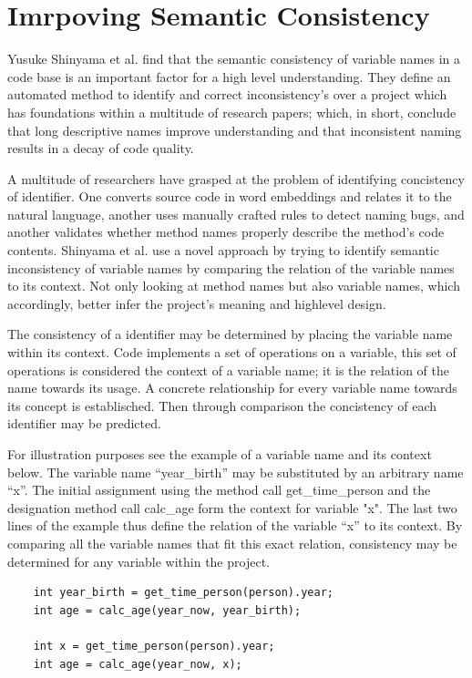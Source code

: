 \documentclass[a4paper,12pt]{article}
\begin{document}
\newpage

\section{Imrpoving Semantic Consistency}
Yusuke Shinyama et al. find that the semantic consistency of variable names in a code base is an important factor for a high level understanding. They define an automated method to identify and correct inconsistency’s over a project which has foundations within a multitude of research papers; which, in short, conclude that long descriptive names improve understanding and that inconsistent naming results in a decay of code quality.

A multitude of researchers have grasped at the problem of identifying concistency of identifier. One converts source code in word embeddings and relates it to the natural language, another uses manually crafted rules to detect naming bugs, and another validates whether method names properly describe the method’s code contents. Shinyama et al. use a novel approach by trying to identify semantic inconsistency of variable names by comparing the relation of the variable names to its context. Not only looking at method names but also variable names, which accordingly, better infer the project’s meaning and highlevel design.

The consistency of a identifier may be determined by placing the variable name within its context. Code implements a set of operations on a variable, this set of operations is considered the context of a variable name; it is the relation of the name towards its usage. A concrete relationship for every variable name towards its concept is establisched. Then through comparison the concistency of each identifier may be predicted. 

For illustration purposes see the example of a variable name and its context below. The variable name “year\_birth” may be substituted by an arbitrary name “x”. The initial assignment using the method call get\_time\_person and the designation method call calc\_age form the context for variable "x". The last two lines of the example thus define the relation of the variable “x” to its context. By comparing all the variable names that fit this exact relation, consistency may be determined for any variable within the project.

\begin{verbatim}
    int year_birth = get_time_person(person).year;
    int age = calc_age(year_now, year_birth);

    int x = get_time_person(person).year;
    int age = calc_age(year_now, x);
\end{verbatim}
\end{document}
